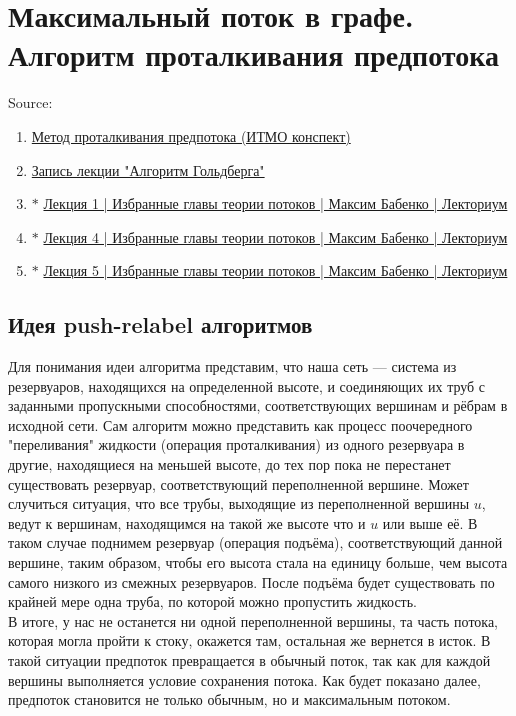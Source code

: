 \section{Максимальный поток в графе. Алгоритм проталкивания предпотока}
    Source:
    \begin{enumerate}
        \item \href{https://neerc.ifmo.ru/wiki/index.php?title=Метод_проталкивания_предпотока}{Метод проталкивания предпотока (ИТМО конспект)}
        \item \href{https://vec.etu.ru/moodle/mod/resource/view.php?id=154630}{Запись лекции "Алгоритм Гольдберга"}
        \item $\ast$ \href{https://www.youtube.com/watch?v=knZXYrKYYbI}{Лекция 1 | Избранные главы теории потоков | Максим Бабенко | Лекториум}
        \item $\ast$ \href{https://www.youtube.com/watch?v=Na8jHUJtbYY}{Лекция 4 | Избранные главы теории потоков | Максим Бабенко | Лекториум}
        \item $\ast$ \href{https://www.youtube.com/watch?v=hYsVDmGaxkQ}{Лекция 5 | Избранные главы теории потоков | Максим Бабенко | Лекториум}
    \end{enumerate}
    \subsection{Идея push-relabel алгоритмов}
        Для понимания идеи алгоритма представим, что наша сеть — система из резервуаров, находящихся на определенной высоте, и соединяющих их труб с заданными пропускными способностями, соответствующих вершинам и рёбрам в исходной сети. Сам алгоритм можно представить как процесс поочередного "переливания" жидкости (операция проталкивания) из одного резервуара в другие, находящиеся на меньшей высоте, до тех пор пока не перестанет существовать резервуар, соответствующий переполненной вершине. Может случиться ситуация, что все трубы, выходящие из переполненной вершины $u$, ведут к вершинам, находящимся на такой же высоте что и $u$ или выше её. В таком случае поднимем резервуар (операция подъёма), соответствующий данной вершине, таким образом, чтобы его высота стала на единицу больше, чем высота самого низкого из смежных резервуаров. После подъёма будет существовать по крайней мере одна труба, по которой можно пропустить жидкость.\\
    
        В итоге, у нас не останется ни одной переполненной вершины, та часть потока, которая могла пройти к стоку, окажется там, остальная же вернется в исток. В такой ситуации предпоток превращается в обычный поток, так как для каждой вершины выполняется условие сохранения потока. Как будет показано далее, предпоток становится не только обычным, но и максимальным потоком.
    
